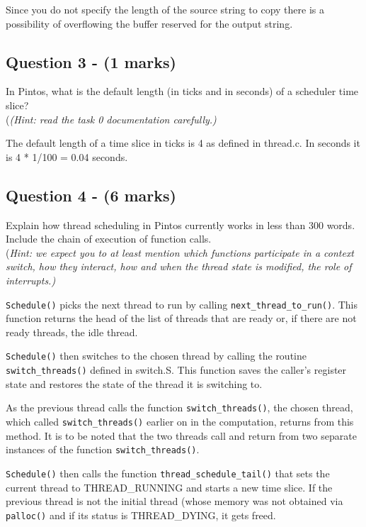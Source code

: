 \documentclass[a4paper,12pt]{article}
\begin{document}
Since you do not specify the length of the source string to copy there is a possibility of overflowing the buffer reserved for the output string.\\

\subsection*{Question 3 - (1 marks)}
In Pintos, what is the default length (in ticks and in seconds) of a scheduler time slice? \\
(\textit{(Hint: read the task 0 documentation carefully.)}

The default length of a time slice in ticks is 4 as defined in thread.c. In seconds it is 4 * 1/100 = 0.04 seconds.\\

\subsection*{Question 4 - (6 marks)}
Explain how thread scheduling in Pintos currently works in less than 300 words. 
Include the chain of execution of function calls. \\
(\textit{Hint: we expect you to at least mention which functions participate in a context switch, how they interact, how and when the thread state is modified, the role of interrupts.)}

\texttt{Schedule()} picks the next thread to run by calling \texttt{next_thread_to_run()}. This function returns the head of the list of threads that are ready or, if there are not ready threads, the idle thread.

\texttt{Schedule()}  then switches to the chosen thread by calling the routine \texttt{switch_threads()} defined in switch.S. This function saves the caller’s register state and restores the state of the thread it is switching to. 

As the previous thread calls the function \texttt{switch_threads()}, the chosen thread, which called \texttt{switch_threads()} earlier on in the computation, returns from this method. It is to be noted that the two threads call and return from two separate instances of the function \texttt{switch_threads()}.

\texttt{Schedule()} then calls the function \texttt{thread_schedule_tail()} that sets the current thread to THREAD_RUNNING and starts a new time slice. If the previous thread is not the initial thread (whose memory was not obtained via \texttt{palloc()} and if its status is THREAD_DYING, it gets freed.
\end{document}
